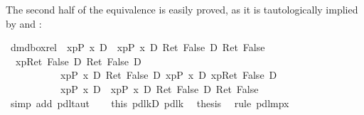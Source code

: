 The second half of the equivalence is easily proved, as it is tautologically
implied by  and :
\begin{isabellebody}
\isanewline
{}\ dmd{\isacharunderscore}box{\isacharunderscore}rel{}{\isacharcolon}\ {\isachardoublequote}{\isasymturnstile}\ {\isasymlangle}x{\isasymleftarrow}p{\isasymrangle}{\isacharparenleft}P\ x{\isacharparenright}\ {\isasymlongrightarrow}\isactrlsub D\ {\isacharbrackleft}{\isacharhash}\ x{\isasymleftarrow}p{\isacharbrackright}{\isacharparenleft}P\ x\ {\isasymlongrightarrow}\isactrlsub D\ Ret\ False{\isacharparenright}\ {\isasymlongrightarrow}\isactrlsub D\ Ret\ False{\isachardoublequote}\isanewline
\isamarkupfalse%
\ {\isacharminus}\isanewline
\ \ \isamarkupfalse%
\ {\isachardoublequote}{\isasymturnstile}\ {\isacharparenleft}{\isasymlangle}x{\isasymleftarrow}p{\isasymrangle}{\isacharparenleft}Ret\ False{\isacharparenright}\ {\isasymlongrightarrow}\isactrlsub D\ Ret\ False{\isacharparenright}\ {\isasymlongrightarrow}\isactrlsub D\ \isanewline
\ \ \ \ \ \ \ \ \ \ {\isacharparenleft}{\isacharbrackleft}{\isacharhash}\ x{\isasymleftarrow}p{\isacharbrackright}{\isacharparenleft}P\ x\ {\isasymlongrightarrow}\isactrlsub D\ Ret\ False{\isacharparenright}\ {\isasymlongrightarrow}\isactrlsub D\ {\isasymlangle}x{\isasymleftarrow}p{\isasymrangle}{\isacharparenleft}P\ x{\isacharparenright}\ {\isasymlongrightarrow}\isactrlsub D\ {\isasymlangle}x{\isasymleftarrow}p{\isasymrangle}{\isacharparenleft}Ret\ False{\isacharparenright}{\isacharparenright}\ {\isasymlongrightarrow}\isactrlsub D\ \ \isanewline
\ \ \ \ \ \ \ \ \ \ \ {\isasymlangle}x{\isasymleftarrow}p{\isasymrangle}{\isacharparenleft}P\ x{\isacharparenright}\ {\isasymlongrightarrow}\isactrlsub D\ {\isacharbrackleft}{\isacharhash}\ x{\isasymleftarrow}p{\isacharbrackright}{\isacharparenleft}P\ x\ {\isasymlongrightarrow}\isactrlsub D\ Ret\ False{\isacharparenright}\ {\isasymlongrightarrow}\isactrlsub D\ Ret\ False{\isachardoublequote}\isanewline
\ \ \ \ \isamarkupfalse%
\ {\isacharparenleft}simp\ add{\isacharcolon}\ pdl{\isacharunderscore}taut{\isacharparenright}\isanewline
\ \ \isamarkupfalse%
\ this\ pdl{\isacharunderscore}k{}D\ pdl{\isacharunderscore}k{}\ \isamarkupfalse%
\ {\isacharquery}thesis\ \isamarkupfalse%
\ {\isacharparenleft}rule\ pdl{\isacharunderscore}mp{\isacharunderscore}{}x{\isacharparenright}\isanewline
\isamarkupfalse%
\isamarkupfalse%
\end{isabellebody}

